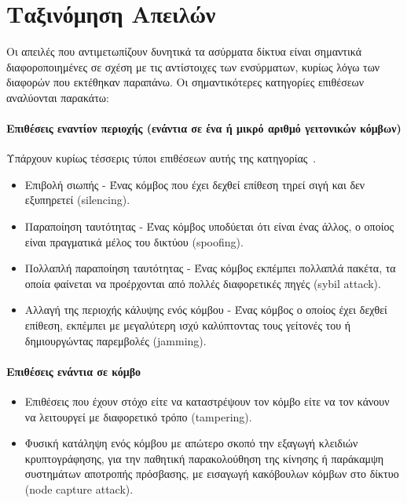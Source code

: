 \documentclass[12pt]{report}
\begin{document}
\section{Ταξινόμηση Απειλών}
Οι απειλές που αντιμετωπίζουν δυνητικά τα ασύρματα δίκτυα είναι σημαντικά διαφοροποιημένες σε σχέση με τις αντίστοιχες των ενσύρματων, κυρίως λόγω των διαφορών που εκτέθηκαν παραπάνω. Οι σημαντικότερες κατηγορίες επιθέσεων αναλύονται παρακάτω:
\paragraph{Επιθέσεις εναντίον περιοχής (ενάντια σε ένα ή μικρό αριθμό γειτονικών κόμβων)} Υπάρχουν κυρίως τέσσερις τύποι επιθέσεων αυτής της κατηγορίας~\cite{paper:02}.
\begin{itemize}
  \item Επιβολή σιωπής - Ένας κόμβος που έχει δεχθεί επίθεση τηρεί σιγή και δεν εξυπηρετεί (\textlatin{silencing}).
  \item Παραποίηση ταυτότητας - Ένας κόμβος υποδύεται ότι είναι ένας άλλος, ο οποίος είναι πραγματικά μέλος του δικτύου (\textlatin{spoofing}).
  \item Πολλαπλή παραποίηση ταυτότητας - Ένας κόμβος εκπέμπει πολλαπλά πακέτα, τα οποία φαίνεται να προέρχονται από πολλές διαφορετικές πηγές (\textlatin{sybil attack}).
  \item Αλλαγή της περιοχής κάλυψης ενός κόμβου - Ένας κόμβος ο οποίος έχει δεχθεί επίθεση, εκπέμπει με μεγαλύτερη ισχύ καλύπτοντας τους γείτονές του ή δημιουργώντας παρεμβολές (\textlatin{jamming}).
\end{itemize}

\paragraph{Επιθέσεις ενάντια σε κόμβο}
\begin{itemize}
	\item Επιθέσεις που έχουν στόχο είτε να καταστρέψουν τον κόμβο είτε να τον κάνουν να λειτουργεί με διαφορετικό τρόπο (\textlatin{tampering}).
	\item Φυσική κατάληψη ενός κόμβου με απώτερο σκοπό την εξαγωγή κλειδιών κρυπτογράφησης, για την παθητική παρακολούθηση της κίνησης ή παράκαμψη συστημάτων αποτροπής πρόσβασης, με εισαγωγή κακόβουλων κόμβων στο δίκτυο (\textlatin{node capture attack}).
\end{itemize}
\end{document}
